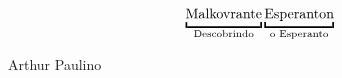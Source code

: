 \documentclass{article}
\begin{document}
\vspace*{\fill}
\begin{center}

\begin{LARGE}
\[
    \underbracket{\vphantom{q}\textrm{Malkovrante}}_{\textrm{Descobrindo}}
    \underbracket{\vphantom{q}\textrm{Esperanton}}_{\textrm{o Esperanto}}
\]
\end{LARGE}

\vspace{2cm}Arthur Paulino

\end{center}
\vspace*{\fill}

\thispagestyle{empty}
\newpage

\addtocounter{page}{-1}


\end{document}
